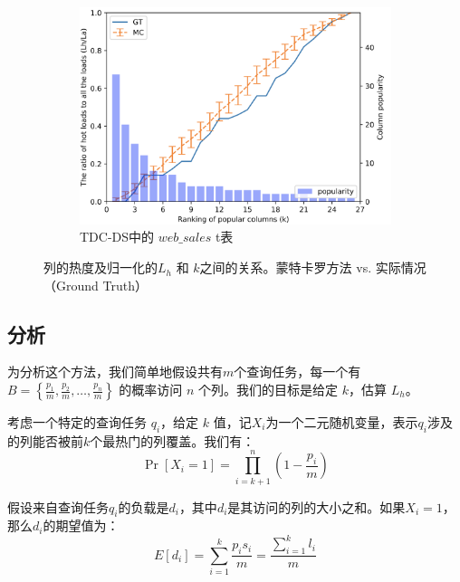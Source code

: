 \begin{figure}[]
    \begin{subfigure}[t]{0.5\textwidth}
        \centering
        \includegraphics[width=1\textwidth]{img/cw-cache/ca_web_sales}
        \caption{TDC-DS中的 $web\_sales$ t表}
        \label{fig:ca-ws}
    \end{subfigure}%
    \caption{列的热度及归一化的$L_h$ 和 $k$之间的关系。蒙特卡罗方法 vs. 实际情况（Ground Truth）}
    \label{fig:mc_gt}
\end{figure}

\subsection{分析}

\par 为分析这个方法，我们简单地假设共有$m$个查询任务，每一个有 $B = \left\{\frac{p_{1}}{m}, \frac{p_{2}}{m}, \dots, \frac{p_{n}}{m}\right\}$ 的概率访问 $n$ 个列。我们的目标是给定 $k$，估算 $L_h$。

\par 考虑一个特定的查询任务 $q_i$，给定 $k$ 值，记$X_i$为一个二元随机变量，表示$q_i$涉及 的列能否被前$k$个最热门的列覆盖。我们有：
\begin{equation}
\Pr\left[X_{i}=1\right]=\prod_{i=k+1}^{n}\left(1-\frac{p_{i}}{m}\right)
\end{equation}

\par 假设来自查询任务$q_i$的负载是$d_i$，其中$d_i$是其访问的列的大小之和。如果$X_i =1$，那么$d_i$的期望值为：
\begin{equation}
E\left[d_i\right]=\sum_{i=1}^{k} \frac{p_{i} s_{i}}{m}=\frac{\sum_{i=1}^{k} l_{i}}{m}
\end{equation}

